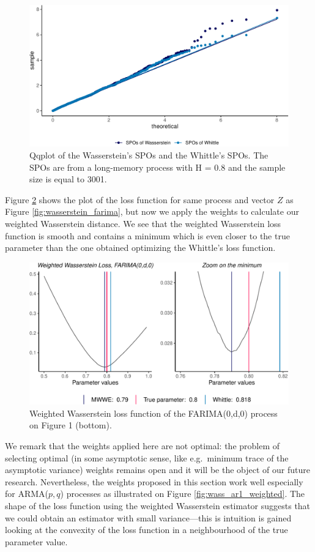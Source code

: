 \documentclass[
  11pt,
]{article}
\begin{document}
\begin{figure}

{\centering \includegraphics[width=0.6\linewidth]{Master_thesis_V3_files/figure-latex/qqplot-1} 

}

\caption{Qqplot of the Wasserstein's SPOs and the Whittle's SPOs. The SPOs are from a long-memory process with H = 0.8 and the sample size is equal to 3001.}\label{fig:qqplot}
\end{figure}

Figure \ref{fig:weighted_wasserstein} shows the plot of the loss
function for same process and vector \(Z\) as Figure
\ref{fig:wasserstein_farima}, but now we apply the weights to calculate
our weighted Wasserstein distance. We see that the weighted Wasserstein
loss function is smooth and contains a minimum which is even closer to
the true parameter than the one obtained optimizing the Whittle's loss
function.

\begin{figure}

{\centering \includegraphics[width=0.6\linewidth]{Master_thesis_V3_files/figure-latex/weighted_wasserstein-1} 

}

\caption{Weighted Wasserstein loss function of the FARIMA(0,d,0) process on Figure 1 (bottom).}\label{fig:weighted_wasserstein}
\end{figure}

We remark that the weights applied here are not optimal: the problem of
selecting optimal (in some asymptotic sense, like e.g.~minimum trace of
the asymptotic variance) weights remains open and it will be the object
of our future research. Nevertheless, the weights proposed in this
section work well especially for ARMA(\(p,q\)) processes as illustrated
on Figure \ref{fig:wass_ar1_weighted}. The shape of the loss function
using the weighted Wasserstein estimator suggests that we could obtain
an estimator with small variance---this is intuition is gained looking
at the convexity of the loss function in a neighbourhood of the true
parameter value. 
\end{document}
